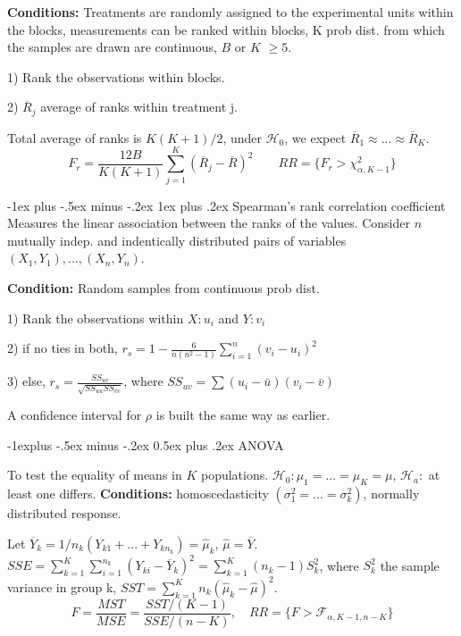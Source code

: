 \documentclass[8pt,landscape]{extarticle}
\makeatletter
\renewcommand{\subsection}{\@startsection{subsection}{2}{0mm}%
                                {-1explus -.5ex minus -.2ex}%
                                {0.5ex plus .2ex}%
                                {\normalfont\normalsize\bfseries}}
\renewcommand{\subsubsection}{\@startsection{subsubsection}{3}{0mm}%
                                {-1ex plus -.5ex minus -.2ex}%
                                {1ex plus .2ex}%
                                {\normalfont\small\bfseries}}
\makeatother
\begin{document}
\begin{multicols}{3}
\textbf{Conditions:} Treatments are randomly assigned to the experimental units within the blocks, measurements can be ranked within blocks, K prob dist. from which the samples are drawn are continuous, $B$ or $K$ $\geq 5$.

1) Rank the observations within blocks.

2) $\overline{R}_j$ average of ranks within treatment j.

Total average of ranks is $K(K+1)/2$, under $\mathcal{H}_0$, we expect $\overline{R}_1 \approx ... \approx \overline{R}_K$. 
$$F_r = \frac{12 B} {K(K+1)} \sum^K_{j=1} (\overline{R}_j - \overline{R})^2 \quad \quad RR = \{ F_r > \chi^2_{\alpha, K-1}\}$$

\subsubsection{Spearman's rank correlation coefficient}
Measures the linear association between the ranks of the values.
Consider $n$ mutually indep. and indentically distributed pairs of variables $(X_1, Y_1),...,(X_n, Y_n)$.

\textbf{Condition:} Random samples from continuous prob dist.

1) Rank the observations within $X : u_i$ and $Y: v_i$

2) if no ties in both, $r_s = 1- \frac{6}{n(n^2-1)}\sum_{i=1}^n (v_i-u_i)^2$

3) else, $r_s = \frac{SS_{uv}}{\sqrt{SS_{uu}SS_{vv}}}$, where $SS_{uv} = \sum (u_i -\bar{u})(v_i -\bar{v})$

A confidence interval for $\rho$ is built the same way as earlier.

\subsection{ANOVA}

To test the equality of means in $K$ populations. $\mathcal{H}_0: \mu_1 = ... = \mu_K =\mu$, $\mathcal{H}_a:$ at least one differs. 
\textbf{Conditions:} homoscedasticity $(\sigma_1^2 =...=\sigma_k^2)$, normally distributed response.

Let $\overline{Y}_k = 1/n_k(Y_{k1}+...+ Y_{kn_k}) = \hat{\mu}_k$, $\hat{\mu} = \overline{Y}$. $SSE = \sum_{k=1}^K \sum_{i=1}^{n_k} (Y_{ki} - \overline{Y}_k)^2 = \sum_{k=1}^K (n_k -1)S_k^2$, where $S_k^2$ the sample variance in group k,  $SST = \sum_{k=1}^K n_k (\hat{\mu}_k - \hat{\mu})^2$.
$$F= \frac{MST}{MSE}= \frac{SST/(K-1)}{SSE/(n-K)}, \quad RR = \{ F> \mathcal{F}_{\alpha, K-1, n-K}\}$$


\end{multicols}
\end{document}
